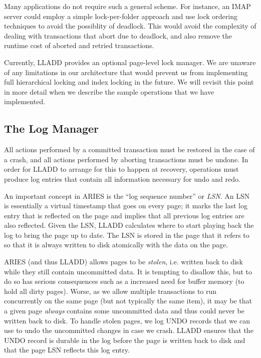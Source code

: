 \documentclass[letterpaper,english]{article}
\begin{document}
Many applications do not require such a general scheme.  For instance,
an IMAP server could employ a simple lock-per-folder approach and use
lock ordering techniques to avoid the possiblity of deadlock.  This
would avoid the complexity of dealing with transactions that abort due
to deadlock, and also remove the runtime cost of aborted and retried
transactions.  

Currently, LLADD provides an optional page-level lock manager.  We are
unaware of any limitations in our architecture that would prevent us
from implementing full hierarchical locking and index locking in the
future.  We will revisit this point in more detail when we describe
the sample operations that we have implemented.


\subsection{The Log Manager}

All actions performed by a committed transaction must be
restored in the case of a crash, and all actions performed by aborting
transactions must be undone. In order for LLADD to arrange for this
to happen at recovery, operations must produce log entries that contain
all information necessary for undo and redo.

An important concept in ARIES is the ``log sequence number'' or {\em
LSN}.  An LSN is essentially a virtual timestamp that goes on every
page; it marks the last log entry that is reflected on the page and
implies that all previous log entries are also reflected.  Given the
LSN, LLADD calculates where to start playing back the log to bring the
page up to date.  The LSN is stored in the page that it refers to so
that it is always written to disk atomically with the data on the
page.

ARIES (and thus LLADD) allows pages to be {\em stolen}, i.e. written
back to disk while they still contain uncommitted data.  It is
tempting to disallow this, but to do so has serious consequences such as
a increased need for buffer memory (to hold all dirty pages). Worse,
as we allow multiple transactions to run concurrently on the same page
(but not typically the same item), it may be that a given page {\em
always} contains some uncommitted data and thus could never be written
back to disk.  To handle stolen pages, we log UNDO records that
we can use to undo the uncommitted changes in case we crash.  LLADD
ensures that the UNDO record is durable in the log before the
page is written back to disk and that the page LSN reflects this log entry.
\end{document}
